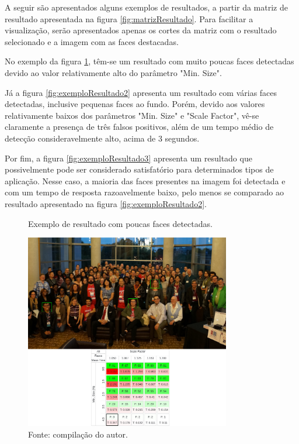 A seguir são apresentados alguns exemplos de resultados, a partir da matriz de resultado apresentada na figura \ref{fig:matrizResultado}. Para facilitar a visualização, serão apresentados apenas os cortes da matriz com o resultado selecionado e a imagem com as faces destacadas.

No exemplo da figura \ref{fig:exemploResultado1}, têm-se um resultado com muito poucas faces detectadas devido ao valor relativamente alto do parâmetro "Min. Size".

Já a figura \ref{fig:exemploResultado2} apresenta um resultado com várias faces detectadas, inclusive pequenas faces ao fundo. Porém, devido aos valores relativamente baixos dos parâmetros "Min. Size" e "Scale Factor", vê-se claramente a presença de três falsos positivos, além de um tempo médio de detecção consideravelmente alto, acima de 3 segundos.

Por fim, a figura \ref{fig:exemploResultado3} apresenta um resultado que possivelmente pode ser considerado satisfatório para determinados tipos de aplicação. Nesse caso, a maioria das faces presentes na imagem foi detectada e com um tempo de resposta razoavelmente baixo, pelo menos se comparado ao resultado apresentado na figura \ref{fig:exemploResultado2}.

\begin{figure}[h]
    \centering
    \caption[Exemplo de resultado com poucas faces detectadas.]{Exemplo de resultado com poucas faces detectadas.}
    \includegraphics[width=0.8\textwidth]{Cap3_Desenvolvimento/Figures/exemplo_resultado_1.jpg}
    \caption*{Fonte: compilação do autor.\footnotemark[\value{footnote}]}
    \label{fig:exemploResultado1}
\end{figure}

